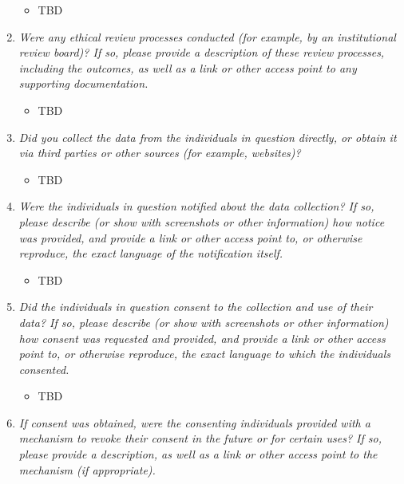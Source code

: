 \documentclass[
  letterpaper,
  DIV=11,
  numbers=noendperiod]{scrartcl}
\providecommand{\tightlist}{%
  \setlength{\itemsep}{0pt}\setlength{\parskip}{0pt}}\usepackage{longtable,booktabs,array}
\begin{document}
\begin{enumerate}
  \begin{itemize}
  \tightlist
  \item
    TBD
  \end{itemize}
\item
  \emph{Were any ethical review processes conducted (for example, by an
  institutional review board)? If so, please provide a description of
  these review processes, including the outcomes, as well as a link or
  other access point to any supporting documentation.}

  \begin{itemize}
  \tightlist
  \item
    TBD
  \end{itemize}
\item
  \emph{Did you collect the data from the individuals in question
  directly, or obtain it via third parties or other sources (for
  example, websites)?}

  \begin{itemize}
  \tightlist
  \item
    TBD
  \end{itemize}
\item
  \emph{Were the individuals in question notified about the data
  collection? If so, please describe (or show with screenshots or other
  information) how notice was provided, and provide a link or other
  access point to, or otherwise reproduce, the exact language of the
  notification itself.}

  \begin{itemize}
  \tightlist
  \item
    TBD
  \end{itemize}
\item
  \emph{Did the individuals in question consent to the collection and
  use of their data? If so, please describe (or show with screenshots or
  other information) how consent was requested and provided, and provide
  a link or other access point to, or otherwise reproduce, the exact
  language to which the individuals consented.}

  \begin{itemize}
  \tightlist
  \item
    TBD
  \end{itemize}
\item
  \emph{If consent was obtained, were the consenting individuals
  provided with a mechanism to revoke their consent in the future or for
  certain uses? If so, please provide a description, as well as a link
  or other access point to the mechanism (if appropriate).}


\end{enumerate}
\end{document}
